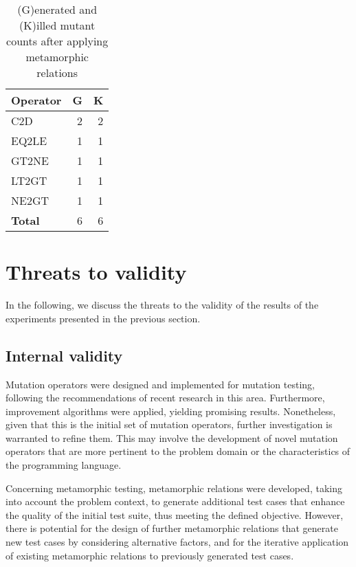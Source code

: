 \begin{table}
    \centering
    \begin{tabular}{lrr}
    \toprule
    \textbf{Operator} & \textbf{G} &  \textbf{K} \\
    \midrule
C2D         & 2 & 2 \\
EQ2LE   & 1     & 1 \\
GT2NE   & 1     & 1 \\
LT2GT   & 1     & 1 \\
NE2GT   & 1     & 1 \\

    \midrule
    \textbf{Total} & 6 & 6  \\
    \bottomrule
    \end{tabular}
    \caption{(G)enerated and (K)illed mutant counts after applying metamorphic relations}
    \label{tab:mutant-counts2}
\end{table}


\section{Threats to validity}
In the following, we discuss the threats to the validity of the results of the experiments presented in the
previous section.

\subsection{Internal validity}
Mutation operators were designed and implemented for mutation testing, following the recommendations of recent research in this area. Furthermore, improvement algorithms were applied, yielding promising results. Nonetheless, given that this is the initial set of mutation operators, further investigation is warranted to refine them. This may involve the development of novel mutation operators that are more pertinent to the problem domain or the characteristics of the programming language.

Concerning metamorphic testing, metamorphic relations were developed, taking into account the problem context, to generate additional test cases that enhance the quality of the initial test suite, thus meeting the defined objective. However, there is potential for the design of further metamorphic relations that generate new test cases by considering alternative factors, and for the iterative application of existing metamorphic relations to previously generated test cases.

